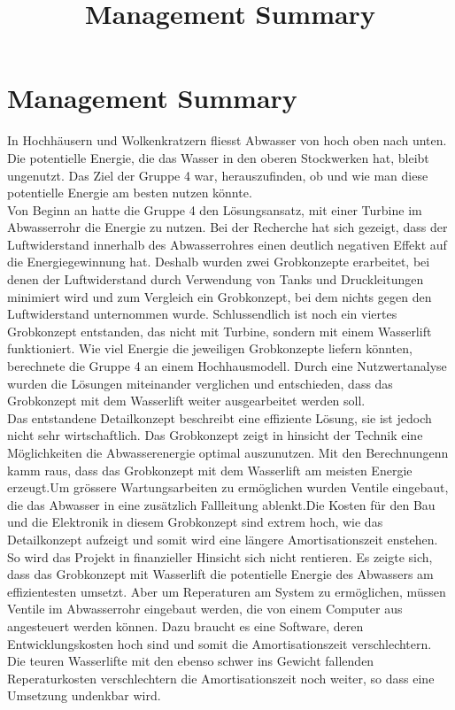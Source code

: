 \documentclass[12pt]{article}
\title{Management Summary}
\begin{document}
\section*{Management Summary}
In Hochhäusern und Wolkenkratzern fliesst Abwasser von hoch oben nach unten. Die potentielle Energie, die das Wasser in den oberen Stockwerken hat, bleibt ungenutzt. Das Ziel der Gruppe 4 war, herauszufinden, ob und wie man diese potentielle Energie am besten nutzen könnte.\\


Von Beginn an hatte die Gruppe 4 den Lösungsansatz, mit einer Turbine im Abwasserrohr die Energie zu nutzen. Bei der Recherche hat sich gezeigt, dass der Luftwiderstand innerhalb des Abwasserrohres einen deutlich negativen Effekt auf die Energiegewinnung hat. Deshalb wurden zwei Grobkonzepte erarbeitet, bei denen der Luftwiderstand durch Verwendung von Tanks und Druckleitungen minimiert wird und zum Vergleich ein Grobkonzept, bei dem nichts gegen den Luftwiderstand unternommen wurde. Schlussendlich ist noch ein viertes Grobkonzept entstanden, das nicht mit Turbine, sondern mit einem Wasserlift funktioniert. Wie viel Energie die jeweiligen Grobkonzepte liefern könnten, berechnete die Gruppe 4 an einem Hochhausmodell. Durch eine Nutzwertanalyse wurden die Lösungen miteinander verglichen und entschieden, dass das Grobkonzept mit dem Wasserlift weiter ausgearbeitet werden soll.\\


Das entstandene Detailkonzept beschreibt eine effiziente Lösung, sie ist jedoch nicht sehr wirtschaftlich. 
Das Grobkonzept zeigt in hinsicht der Technik eine Möglichkeiten die Abwasserenergie optimal auszunutzen. Mit den Berechnungenn kamm raus, dass das Grobkonzept mit dem Wasserlift am meisten Energie erzeugt.Um grössere Wartungsarbeiten zu ermöglichen wurden Ventile eingebaut, die das Abwasser in eine zusätzlich Fallleitung ablenkt.Die Kosten für den Bau und die Elektronik in diesem Grobkonzept sind extrem hoch, wie das Detailkonzept aufzeigt und somit wird eine längere Amortisationszeit enstehen. So wird das Projekt in finanzieller Hinsicht sich nicht rentieren. 
Es zeigte sich, dass das Grobkonzept mit Wasserlift die potentielle Energie des Abwassers am effizientesten umsetzt. Aber um Reperaturen am System zu ermöglichen, müssen Ventile im Abwasserrohr eingebaut werden, die von einem Computer aus angesteuert werden können. Dazu braucht es eine Software, deren Entwicklungskosten hoch sind und somit die Amortisationszeit verschlechtern. Die teuren Wasserlifte mit den ebenso schwer ins Gewicht fallenden Reperaturkosten verschlechtern die Amortisationszeit noch weiter, so dass eine Umsetzung undenkbar wird.
\end{document}
